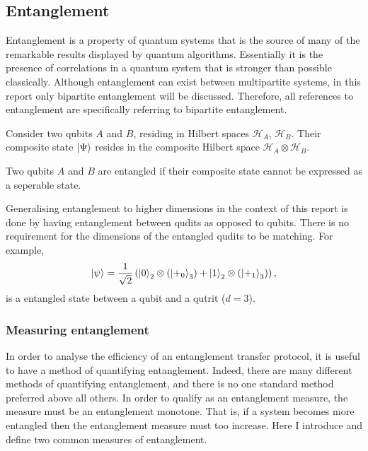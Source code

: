 \subsection{Entanglement}
Entanglement is a property of quantum systems that is the source of many of the remarkable results displayed by quantum algorithms.
Essentially it is the presence of correlations in a quantum system that is stronger than possible classically.
Although entanglement can exist between multipartite systems, in this report only bipartite entanglement will be discussed.
Therefore, all references to entanglement are specifically referring to bipartite entanglement.
\begin{definition}
    Consider two qubits $A$ and $B$, residing in Hilbert spaces $\mathcal{H}_A$, $\mathcal{H}_B$. Their composite state $\ket{\Psi}$ resides in the composite Hilbert space $\mathcal{H}_A \otimes \mathcal{H}_B$.
\end{definition}
\begin{definition}
    Two qubits $A$ and $B$ are entangled if their composite state cannot be expressed as a seperable state.
\end{definition}
Generalising entanglement to higher dimensions in the context of this report is done by having entanglement between qudits as opposed to qubits. There is no requirement for the dimensions of the entangled qudits to be matching. For example,
\begin{equation}
    \ket{\psi} = \frac{1}{\sqrt{2}}\left(\ket{0}_2\otimes\left(\ket{+_0}_3\right) + \ket{1}_2\otimes\left(\ket{+_1}_3\right)\right),
\end{equation}
is a entangled state between a qubit and a qutrit ($d=3$).

\subsubsection{Measuring entanglement}
In order to analyse the efficiency of an entanglement transfer protocol, it is useful to have a method of quantifying entanglement.
Indeed, there are many different methods of quantifying entanglement, and there is no one standard method preferred above all others.
In order to qualify as an entanglement measure, the measure must be an entanglement monotone.
That is, if a system becomes more entangled then the entanglement measure must too increase.
Here I introduce and define two common measures of entanglement.\newline

